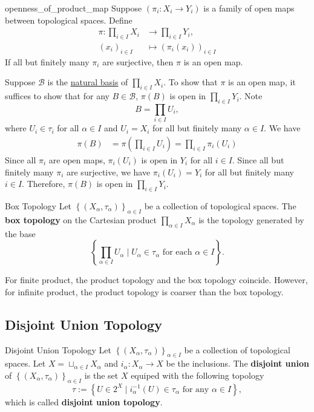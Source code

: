 \documentclass{report}
\begin{document}
\begin{proposition}{}{openness_of_product_map}
	Suppose $(\pi_i:X_i \to Y_i)$ is a family of open maps between topological spaces. Define
	\begin{align*}
		\pi: \prod_{i \in I} X_i & \longrightarrow \prod_{i \in I} Y_i, \\
		(x_i)_{i \in I}          & \longmapsto (\pi_i(x_i))_{i \in I}
	\end{align*}
	If all but finitely many $\pi_i$ are surjective, then $\pi$ is an open map.
\end{proposition}
\begin{prf}
	Suppose $\mathcal{B}$ is the \hyperref[th:basis_of_product_topology]{natural basis} of $\prod_{i \in I} X_i$. To show that $\pi$ is an open map, it suffices to show that for any $B\in \mathcal{B}$, $\pi(B)$ is open in $\prod_{i \in I} Y_i$. Note 
	\[
	B=\prod_{i\in I}U_i,
	\]
	where $U_i\in \tau_i$ for all $\alpha\in I$ and $U_i=X_i$ for all but finitely many $\alpha\in I$. We have
	\begin{align*}
		\pi(B) &= \pi\left(\prod_{i\in I}U_i\right) = \prod_{i\in I}\pi_i(U_i) 
	\end{align*}
	Since all $\pi_i$ are open maps, $\pi_i(U_i)$ is open in $Y_i$ for all $i\in I$. Since all but finitely many $\pi_i$ are surjective, we have $\pi_i(U_i)=Y_i$ for all but finitely many $i\in I$. Therefore, $\pi(B)$ is open in $\prod_{i \in I} Y_i$.
\end{prf}

\begin{definition}{Box Topology}{}
	Let $\left\{(X_\alpha,\tau_\alpha)\right\}_{\alpha\in I}$ be a collection of topological spaces. The \textbf{box topology} on the Cartesian product $\prod_{\alpha\in I}X_\alpha$ is the topology generated by the base
	\[
		\left\{\prod_{\alpha\in I}U_\alpha\mid U_\alpha\in \tau_\alpha\text{ for each }\alpha\in I\right\}.
	\]
\end{definition}

For finite product, the product topology and the box topology coincide. However, for infinite product, the product topology is coarser than the box topology.


\subsection{Disjoint Union Topology}
\begin{definition}{Disjoint Union Topology}{}
	Let $\left\{(X_\alpha,\tau_\alpha)\right\}_{\alpha\in I}$ be a collection of topological spaces. Let $X=\sqcup_{\alpha\in I}X_\alpha$ and $i_\alpha:X_\alpha\to X$ be the inclusions. The \textbf{disjoint union} of $\left\{(X_\alpha,\tau_\alpha)\right\}_{\alpha\in I}$ is the set $X$ equiped with the following topology
	\[
		\tau:=\left\{U\in 2^{X}\mid i_{\alpha}^{-1}(U)\in \tau_\alpha\text{ for any }\alpha\in I\right\},
	\]
	which is called \textbf{disjoint union topology}.
\end{definition}
\end{document}
